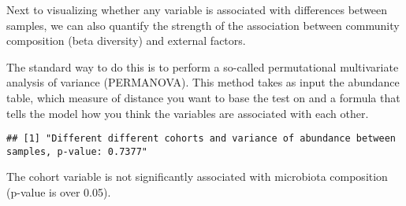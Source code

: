 \documentclass[
  oneside]{book}
\newenvironment{Shaded}{\begin{snugshade}}{\end{snugshade}}
\newcommand{\AttributeTok}[1]{\textcolor[rgb]{0.77,0.63,0.00}{#1}}
\newcommand{\CommentTok}[1]{\textcolor[rgb]{0.56,0.35,0.01}{\textit{#1}}}
\newcommand{\DecValTok}[1]{\textcolor[rgb]{0.00,0.00,0.81}{#1}}
\newcommand{\FunctionTok}[1]{\textcolor[rgb]{0.00,0.00,0.00}{#1}}
\newcommand{\NormalTok}[1]{#1}
\newcommand{\OtherTok}[1]{\textcolor[rgb]{0.56,0.35,0.01}{#1}}
\newcommand{\SpecialCharTok}[1]{\textcolor[rgb]{0.00,0.00,0.00}{#1}}
\newcommand{\StringTok}[1]{\textcolor[rgb]{0.31,0.60,0.02}{#1}}
\begin{document}
Next to visualizing whether any variable is associated with
differences between samples, we can also quantify the strength of the
association between community composition (beta diversity) and
external factors.

The standard way to do this is to perform a so-called permutational
multivariate analysis of variance (PERMANOVA). This method takes as
input the abundance table, which measure of distance you want to base
the test on and a formula that tells the model how you think the
variables are associated with each other.

\begin{Shaded}
\end{Shaded}

\begin{verbatim}
## [1] "Different different cohorts and variance of abundance between samples, p-value: 0.7377"
\end{verbatim}

The cohort variable is not significantly associated with
microbiota composition (p-value is over 0.05).
\end{document}

